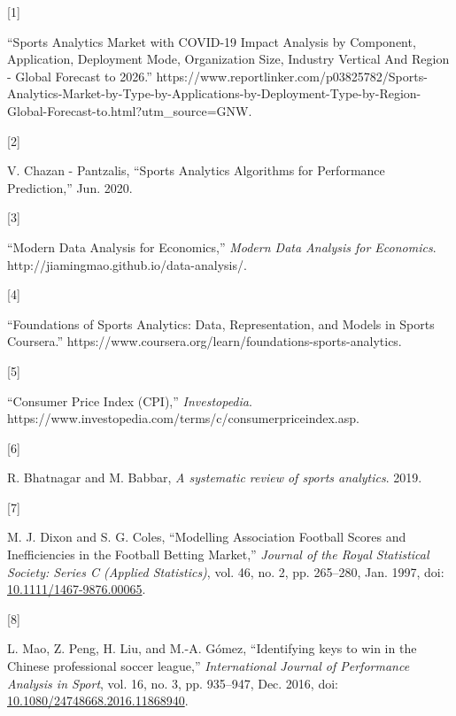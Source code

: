 \documentclass[
  english,
  doc,floatsintext]{apa6}
\newlength{\cslhangindent}
\newlength{\csllabelwidth}
\newlength{\cslentryspacingunit} %
\newenvironment{CSLReferences}[2] %
 {%
  \setlength{\parindent}{0pt}
  \ifodd #1
  \let\oldpar\par
  \def\par{\hangindent=\cslhangindent\oldpar}
  \fi
  \setlength{\parskip}{#2\cslentryspacingunit}
 }%
 {}
\newcommand{\CSLLeftMargin}[1]{\parbox[t]{\csllabelwidth}{#1}}
\newcommand{\CSLRightInline}[1]{\parbox[t]{\linewidth - \csllabelwidth}{#1}\break}
\begin{document}
\hypertarget{refs}{}
\begin{CSLReferences}{0}{0}
\leavevmode{}%
\CSLLeftMargin{{[}1{]} }
\CSLRightInline{{``Sports {Analytics Market} with {COVID-19 Impact Analysis} by {Component}, {Application}, {Deployment Mode}, {Organization Size}, {Industry Vertical And Region} - {Global Forecast} to 2026.''} https://www.reportlinker.com/p03825782/Sports-Analytics-Market-by-Type-by-Applications-by-Deployment-Type-by-Region-Global-Forecast-to.html?utm\_source=GNW.}

\leavevmode{}%
\CSLLeftMargin{{[}2{]} }
\CSLRightInline{V. Chazan - Pantzalis, {``Sports {Analytics Algorithms} for {Performance Prediction},''} Jun. 2020.}

\leavevmode{}%
\CSLLeftMargin{{[}3{]} }
\CSLRightInline{{``Modern {Data Analysis} for {Economics},''} \emph{Modern Data Analysis for Economics}. http://jiamingmao.github.io/data-analysis/.}

\leavevmode{}%
\CSLLeftMargin{{[}4{]} }
\CSLRightInline{{``Foundations of {Sports Analytics}: {Data}, {Representation}, and {Models} in {Sports} \textbar{} {Coursera}.''} https://www.coursera.org/learn/foundations-sports-analytics.}

\leavevmode{}%
\CSLLeftMargin{{[}5{]} }
\CSLRightInline{{``Consumer {Price Index} ({CPI}),''} \emph{Investopedia}. https://www.investopedia.com/terms/c/consumerpriceindex.asp.}

\leavevmode{}%
\CSLLeftMargin{{[}6{]} }
\CSLRightInline{R. Bhatnagar and M. Babbar, \emph{A systematic review of sports analytics}. 2019.}

\leavevmode{}%
\CSLLeftMargin{{[}7{]} }
\CSLRightInline{M. J. Dixon and S. G. Coles, {``Modelling {Association Football Scores} and {Inefficiencies} in the {Football Betting Market},''} \emph{Journal of the Royal Statistical Society: Series C (Applied Statistics)}, vol. 46, no. 2, pp. 265--280, Jan. 1997, doi: \href{https://doi.org/10.1111/1467-9876.00065}{10.1111/1467-9876.00065}.}

\leavevmode{}%
\CSLLeftMargin{{[}8{]} }
\CSLRightInline{L. Mao, Z. Peng, H. Liu, and M.-A. Gómez, {``Identifying keys to win in the {Chinese} professional soccer league,''} \emph{International Journal of Performance Analysis in Sport}, vol. 16, no. 3, pp. 935--947, Dec. 2016, doi: \href{https://doi.org/10.1080/24748668.2016.11868940}{10.1080/24748668.2016.11868940}.}


\end{CSLReferences}
\end{document}
